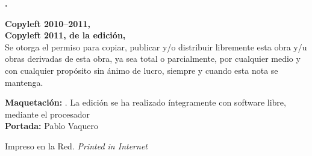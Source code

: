 \noindent
\textbf{\thetitle. \ \thesubtitle}\\
\theauthor

\bigskip\bigskip\footnotesize\noindent
\textbf{Copyleft \copyleft{} 2010--2011, \theauthor}\\
\textbf{Copyleft \copyleft{} 2011, de la edición, \theeditor}\\
Se otorga el permiso para copiar, publicar y/o distribuir libremente esta obra y/u obras derivadas de esta obra, ya sea total o parcialmente, por cualquier medio y con cualquier propósito sin ánimo de lucro, siempre y cuando esta nota se mantenga.

\bigskip\noindent
\textbf{Maquetación:} \theeditor. La edición se ha realizado íntegramente con software libre, mediante el procesador \emph{\LaTeXe}\\
\textbf{Portada:} Pablo Vaquero

\bigskip\noindent
Impreso en la Red. \emph{Printed in Internet}
\normalsize
{}

\endinput
